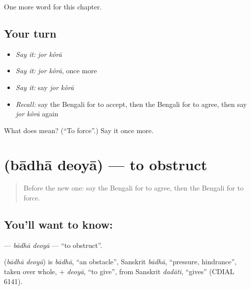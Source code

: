 \begin{grammarlens}[title={What you've built}]
One more word for this chapter.
\end{grammarlens}

\subsection*{Your turn}
\begin{itemize}
\raggedright
  \item \emph{Say it:} \emph{jor kôrā}
  \item \emph{Say it:} \emph{jor kôrā}, once more
  \item \emph{Say it:} say \emph{jor kôrā}
  \item \emph{Recall:} say the Bengali for to accept, then the Bengali for to agree, then say \emph{jor kôrā} again
\end{itemize}

\begin{tcolorbox}[breakable,colback=teal!4,colframe=teal!35!black,title={Before you move on}]
What does   mean? (\textquotedblleft{}To force\textquotedblright{}.) Say it once more.
\end{tcolorbox}
\section[\texorpdfstring{\bn{বাধা} \bn{দেওয়া} (bādhā deoyā)}{বাধা দেওয়া (bādhā deoyā)}]{  (bādhā deoyā) — to obstruct}

\label{lesson:BN-C184-badha-deoya}



\begin{quote}
Before the new one: say the Bengali for to agree, then the Bengali for to force.
\end{quote}

\subsection*{You'll want to know:  }
\textbf{ } — \emph{bādhā deoyā} — \textquotedblleft{}to obstruct\textquotedblright{}.

\begin{cousinweb}
\textbf{ } (\emph{bādhā deoyā}) is \emph{bādhā}, \textquotedblleft{}an obstacle\textquotedblright{}, Sanskrit \emph{bādhā}, \textquotedblleft{}pressure, hindrance\textquotedblright{}, taken over whole, + \emph{deoyā}, \textquotedblleft{}to give\textquotedblright{}, from Sanskrit \emph{dadāti}, \textquotedblleft{}gives\textquotedblright{} (CDIAL 6141).
\end{cousinweb}


